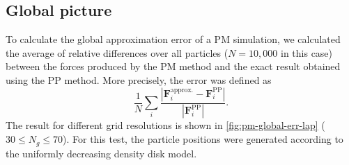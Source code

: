 \subsection{Global picture}\label{subsubsec:pm-global-picture}
To calculate the global approximation error of a PM simulation, we calculated the average of relative differences over all particles ($N=10{,}000$ in this case) between the forces produced by the PM method and the exact result obtained using the PP method.
More precisely, the error was defined as
\begin{equation}\label{eq:force-avg-relative-err}
    \frac{1}{N}\sum_{i} \frac{|\mathbf{F}_i^\text{approx.} - \mathbf{F}_i^\text{PP}|}{|\mathbf{F}_i^\text{PP}|}.
\end{equation}
The result for different grid resolutions is shown in \autoref{fig:pm-global-err-lap} ( $30 \leq N_g \leq 70$).
For this test, the particle positions were generated according to the uniformly decreasing density disk model.
